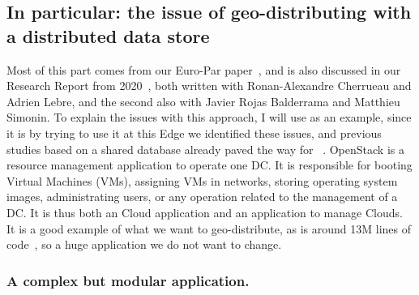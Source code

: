 




\subsection{In particular: the issue of geo-distributing \os with a distributed data store}
\label{ssec:issue-db}


Most of this part comes from our Euro-Par paper~\cite{CDL21}, and is
also discussed in our Research Report from 2020~\cite{CDLR+20}, both
written with Ronan-Alexandre Cherrueau and Adrien Lebre, and the
second also with Javier Rojas Balderrama and Matthieu Simonin.
%
To explain the issues with this approach, I will use \os as an
example, since it is by trying to use it at this Edge we identified
these issues, and previous studies based on a shared database already
paved the way for \os~\cite{LPSD17, BPC16}.
%
OpenStack is a resource management application to operate one DC.  It
is responsible for booting Virtual Machines (VMs), assigning VMs in
networks, storing operating system images, administrating users, or
any operation related to the management of a DC.
%
It is thus both an Cloud application and an application to manage
Clouds.
%
It is a good example of what we want to geo-distribute, as \os is
around 13M lines of code~\cite{openstackloc}, so a huge application we
do not want to change.


\subsubsection{A complex but modular application.}

